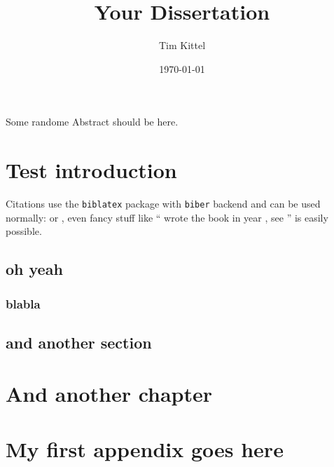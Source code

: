 \documentclass{simple-dissertation}
\title{Your Dissertation}
\date{\today}
\author{Tim Kittel}
\begin{document}
\maketitle

\pagestyle{thesis-preface}


Some randome Abstract should be here.



\cleartorecto
\tableofcontents

\cleartorecto
\pagestyle{thesis}

\chapter{Test introduction}

Citations use the \verb|biblatex| package with \verb|biber| backend and can be used normally: \cite{heitzig2016topology} or \citet{heitzig2016topology}, even fancy stuff like ``\citeauthor{kuznetsov1998elements} wrote the book  in year \citeyear{kuznetsov1998elements}, see \cite{kuznetsov1998elements}'' is easily possible.

\lipsum

\section{oh yeah}

\subsection{blabla}

\section{and another section}

\lipsum

\chapter{And another chapter}


\lipsum

\appendix
\chapter{My first appendix goes here}



\printbibliography
\end{document}

